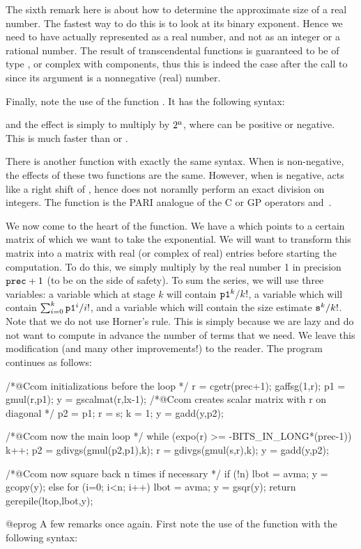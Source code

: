 {The sixth remark here is about how to determine the approximate size
of a real number. The fastest way to do this is to look at its binary
exponent. Hence we need to have  actually represented as a real number,
and not as an integer or a rational number. The result of transcendental
functions is guaranteed to be of type , or complex with 
components, thus this is indeed the case after the call to  since
its argument is a nonnegative (real) number.

Finally, note the use of the function . It has the following
syntax:


\noindent and the effect is simply to multiply  by $2^{\text n}$,
where  can be positive or negative. This is much faster than
 or .

There is another function  with exactly the same syntax.
When  is non-negative, the effects of these two functions are the same.
However, when  is negative,  acts like a right shift of
, hence does not noramlly perform an exact division on integers. The
function   is the PARI analogue of the C or GP operators \kbd{<<}
and~\kbd{>>}.

We now come to the heart of the function. We have a   which
points to a certain matrix of which we want to take the exponential. We will
want to transform this matrix into a matrix with real (or complex of real)
entries before starting the computation. To do this, we simply multiply by
the real number 1 in precision $\kbd{prec}+1$ (to be on the side of safety).
To sum the series, we will use three variables: a variable  which at
stage $k$ will contain $\kbd{p1}^k/k!$, a variable  which will contain
$\sum_{i=0}^k \kbd{p1}^i/i!$, and a variable  which will contain the
size estimate $\kbd{s}^k/k!$. Note that we do not use Horner's rule. This is
simply because we are lazy and do not want to compute in advance the number
of terms that we need. We leave this modification (and many other
improvements!) to the reader. The program continues as follows:

\bprog
  /*@Ccom initializations before the loop */
  r = cgetr(prec+1); gaffsg(1,r); p1 = gmul(r,p1);
  y = gscalmat(r,lx-1); /*@Ccom creates scalar matrix with r on diagonal */
  p2 = p1; r = s; k = 1;
  y = gadd(y,p2);

  /*@Ccom now the main loop */
  while (expo(r) >= -BITS_IN_LONG*(prec-1))
  {
    k++; p2 = gdivgs(gmul(p2,p1),k);
    r = gdivgs(gmul(s,r),k); y = gadd(y,p2);
  }

  /*@Ccom now square back n times if necessary */
  if (!n) { lbot = avma; y = gcopy(y); }
  else
  {
    for (i=0; i<n; i++) { lbot = avma; y = gsqr(y); }
  }
  return gerepile(ltop,lbot,y);
}@eprog
\noindent
A few remarks once again. First note the use of the function
 with the following syntax:

